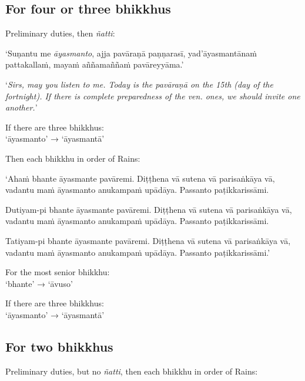 \subsection{For four or three bhikkhus}

Preliminary duties, then \emph{ñatti}:

\vspace*{\parskip}

\begin{paritta}
‘Suṇantu me \emph{āyasmanto}, ajja pavāraṇā paṇṇarasī, yad'āyasmantānaṁ
pattakallaṁ, mayaṁ aññamaññaṁ pavāreyyāma.’
\end{paritta}

‘\emph{Sirs, may you listen to me. Today is the pavāraṇā on the 15th (day of the
fortnight). If there is complete preparedness of the ven. ones, we should
invite one another.}’


If there are three bhikkhus:\\
‘āyasmanto’ → ‘āyasmantā’

Then each bhikkhu in order of Rains:

\vspace*{\parskip}

\begin{paritta}
‘Ahaṁ bhante āyasmante pavāremi. Diṭṭhena vā sutena vā parisaṅkāya vā, vadantu
maṁ āyasmanto anukampaṁ upādāya. Passanto paṭikkarissāmi.

Dutiyam-pi bhante āyasmante pavāremi. Diṭṭhena vā sutena vā parisaṅkāya vā,
vadantu maṁ āyasmanto anukampaṁ upādāya. Passanto paṭikkarissāmi.

Tatiyam-pi bhante āyasmante pavāremi. Diṭṭhena vā sutena vā parisaṅkāya vā,
vadantu maṁ āyasmanto anukampaṁ upādāya. Passanto paṭikkarissāmi.’
\end{paritta}

For the most senior bhikkhu:\\
‘bhante’ → ‘āvuso’

If there are three bhikkhus:\\
‘āyasmanto’ → ‘āyasmantā’

\subsection{For two bhikkhus}

Preliminary duties, but no \emph{ñatti}, then each bhikkhu in order of Rains:

\vspace*{\parskip}

